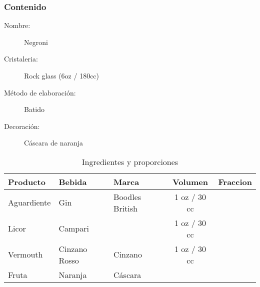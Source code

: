 \bigskip 
\bigskip 
\subsubsection{Contenido}
\bigskip 

\begin{description}
\item[Nombre:] Negroni
\item[Cristaleria:] Rock glass (6oz / 180cc)
\item[M\'etodo de elaboraci\'on:] Batido
\item[Decoraci\'on:] C\'ascara de naranja
\end{description}

\begin{table}[h]
\caption{Ingredientes y proporciones} 
\label{tab:fonts}
\begin{center}       
\begin{tabular}{|l|l|l|c|l|} %
\hline
\rule[-1ex]{0pt}{3.5ex}  \textbf{Producto} & \textbf{Bebida} & \textbf{Marca} & \textbf{Volumen} & \textbf{Fraccion}  \\
\hline
\rule[-1ex]{0pt}{3.5ex}  Aguardiente & Gin 			& Boodles British 		& 1 oz / 30 cc 	&  	\\
\hline
\rule[-1ex]{0pt}{3.5ex}  Licor 		& Campari	 	& 				& 1 oz / 30 cc 		&  	\\
\hline
\rule[-1ex]{0pt}{3.5ex}  Vermouth	& Cinzano Rosso 	& Cinzano 				& 1 oz / 30 cc					& 	\\
\hline
\rule[-1ex]{0pt}{3.5ex}  Fruta 		& Naranja		& C\'ascara		& 								& 	\\
\hline
\end{tabular}
\end{center}
\end{table} 
\bigskip 

